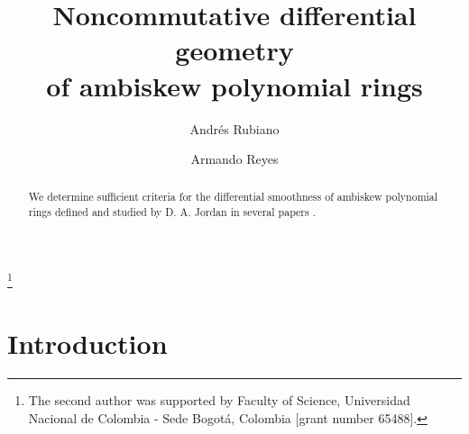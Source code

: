\documentclass{amsart}
\theoremstyle{definition}
\theoremstyle{remark}
\numberwithin{equation}{section}
\begin{document}
\title[Noncommutative geometry of ambiskew polynomial rings]{Noncommutative differential geometry \\ of ambiskew polynomial rings}

\author{Andr\'es Rubiano}
\address{Universidad Distrital Francisco Jos\'e de Caldas}

\author{Armando Reyes}
\address{Universidad Nacional de Colombia - Sede Bogot\'a}

\thanks{The second author was supported by Faculty of Science, Universidad Nacional de Colombia - Sede Bogot\'a, Colombia [grant number 65488].}



\date{}


\begin{abstract} 

We determine sufficient criteria for the differential smoothness of ambiskew polynomial rings defined and studied by D. A. Jordan in several papers \cite{FishJordan2019, Jordan1993b, Jordan2000, JordanWells2013}.

\end{abstract}

\maketitle


\section{Introduction}
\end{document}
